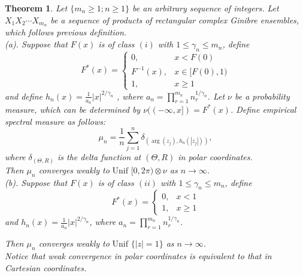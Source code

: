 \documentclass[12pt]{article}
\theoremstyle{plain}
\newtheorem{thm}{\textbf{Theorem}}
\theoremstyle{definition}
\theoremstyle{remark}
\newtheorem{rem}{\textbf{Remark}}
\begin{document}
\begin{thm}\label{thm:main theorem}
    Let $\{m_n\geq 1;n\geq 1\}$ be an arbitrary sequence of integers. Let $X_1X_2\cdots X_{m_n}$ be a sequence of products of rectangular complex Ginibre ensembles, which follows previous definition.\\

   \noindent (a). Suppose that $F(x)$ is of class $(i)$  with $1\leq\gamma_n\leq m_n$, define
    \begin{equation*}
    F^{*}(x)=\left\{\begin{array}{cc}{0,} & {x < F(0)} \\ {F^{-1}(x),} & {x \in[F(0),1)} \\ {1,} & {x \geq 1}\end{array}\right.
    \end{equation*}
    and define $h_n(x)=\frac{1}{a_n}|x|^{2/\gamma_{n}}$ , where $a_n=\prod_{r=1}^{m_n}n_r^{1/\gamma_{n}}$. Let $\nu$ be a probability measure, which can be determined by $\nu((-\infty,x])=F^*(x)$. Define empirical spectral measure as follows:
    \begin{equation*}
    \mu_{n}=\frac{1}{n} \sum_{j=1}^{n} \delta_{({\arg} (z_{j}), h_n(\left|z_{j}\right|))},
    \end{equation*}
    where  $\delta_{(\Theta,R)}$ is the delta function at $(\Theta,R)$ in polar coordinates.\\
    Then $\mu_{n}$ converges weakly to$\text { Unif }[0,2 \pi) \otimes \nu$ as $n\to
    \infty$.\\

     \noindent (b). Suppose that $F(x)$ is of class $(ii)$ with $1\leq\gamma_n\leq m_n$, define
    \begin{equation*}
    F^{*}(x)=\left\{\begin{array}{cc}{0,} & {x < 1} \\ {1,} & {x \geq 1}\end{array}\right.
    \end{equation*}
    and $h_n(x)=\frac{1}{a_n}|x|^{2/\gamma_{n}}$, where $a_n=\prod_{r=1}^{m_n}n_r^{1/\gamma_{n}}$.
    
    Then $\mu_{n}$ converges weakly to$\text { Unif }\{|z|=1\}$ as $n\to \infty$.\\
Notice that weak convergence in polar coordinates is equivalent to that in Cartesian coordinates.
\end{thm}


\end{document}
